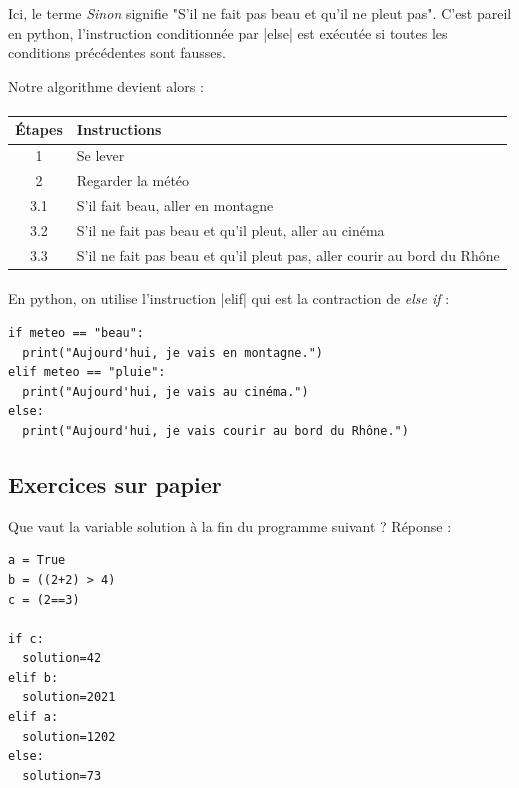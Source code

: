 \documentclass[11pt, a4paper]{book}
\begin{document}
 \begin{remarque} Ici, le terme \textit{Sinon} signifie "S'il ne fait pas beau et qu'il ne pleut pas". C'est pareil en python, l'instruction conditionnée par |else| est exécutée si toutes les conditions précédentes sont fausses. \end{remarque}
 
 Notre algorithme devient alors : 
 
\paragraph{}
\begin{tabular}{ c  l  }
     Étapes & Instructions \\ \hline
     1 & Se lever  \\ 
     2 & Regarder la météo  \\
     3.1 & S'il fait beau, aller en montagne  \\
     3.2 & S'il ne fait pas beau et qu'il pleut, aller au cinéma  \\
     3.3 & S'il ne fait pas beau et qu'il pleut pas, aller courir au bord du Rhône \\
\end{tabular}

\paragraph{}
En python, on utilise l'instruction |elif| qui est la contraction de \textit{else if} :

\begin{lstlisting}
if meteo == "beau":
  print("Aujourd'hui, je vais en montagne.")
elif meteo == "pluie":
  print("Aujourd'hui, je vais au cinéma.")
else:
  print("Aujourd'hui, je vais courir au bord du Rhône.")
\end{lstlisting}


\subsection{Exercices sur papier}

\begin{exercice}
Que vaut la variable solution à la fin du programme suivant ? %
Réponse : 

\end{exercice}
\begin{lstlisting}
a = True
b = ((2+2) > 4)
c = (2==3)

if c:
  solution=42
elif b:
  solution=2021
elif a:
  solution=1202
else:
  solution=73
\end{lstlisting}
\end{document}
